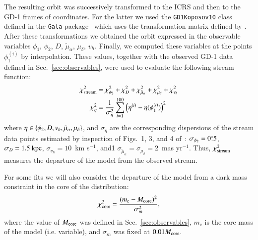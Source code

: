 \documentclass[twocolumn]{aa}
\begin{document}
The resulting orbit was successively transformed to the ICRS and then to the GD-1 frames of coordinates. For the latter we used the \texttt{GD1Koposov10} class defined in the \texttt{Gala} package~\citep{gala,adrian_price_whelan_2020_4159870} which uses the transformation matrix defined by \citet{Koposov_2010}.
After these transformations we obtained the orbit expressed in the observable variables $\phi_1$, $\phi_2$, $D$, $\tilde{\mu}_\alpha$, $\mu_\delta$, $v_h$. Finally, we computed these variables at the points $\phi_1^{(i)}$ by interpolation. These values, together with the observed GD-1 data defined in Sec.~\ref{sec:observables}, were used to evaluate the following stream function:
\begin{align}
   \label{chi2:stream}
   \chi^2_{\rm{stream}} &= \chi^2_{\phi_2} + \chi^2_{D}+ \chi^2_{\tilde{\mu}_\alpha}+ \chi^2_{\mu_\delta}+\chi^2_{v_h}\\
   \label{chi2:component}
   \chi^2_{\eta} &= \frac{1}{\sigma_\eta^2}\sum_{i=1}^{100} \left(\eta^{(i)}-\eta(\phi_1^{(i)})\right)^2
\end{align}
where
$\eta\in\left\{\phi_2, D, v_h, \tilde{\mu}_\alpha, \mu_\delta\right\}$, and $\sigma_\eta$ are the corresponding dispersions of the stream data points estimated by inspection of Figs.~1, 3, and 4 of~\citet{Ibata_2020}:
$\sigma_{\phi_2}=0\overset{\circ}{.} 5$,
$\sigma_{D}= 1.5~\rm{kpc}$,
$\sigma_{v_h} = 10$~km s$^{-1}$, and1
$\sigma_{\tilde{\mu}_\alpha}= \sigma_{\mu_\delta}= 2$~mas yr$^{-1}$.
Thus, $\chi^2_{\rm{stream}}$ measures the departure of the model from the observed stream.

For some fits we will also consider the departure of the model from a dark mass constraint in the core
of the distribution:
\begin{equation}
   \label{chi2:core}
\chi^2_{\rm{core}}=\frac{(m_\mathrm{c}-M_{\rm{core}})^2}{\sigma_m^2},
\end{equation}
where the value of $M_{\rm{core}}$ was defined in Sec.~\ref{sec:observables}, $m_\mathrm{c}$ is the core mass of the model (i.e. variable), and
$\sigma_m$ was fixed at $0.01 M_{\rm{core}}$.
\end{document}
